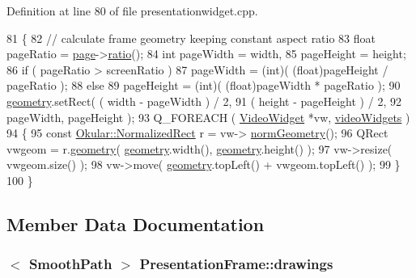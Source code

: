 Definition at line 80 of file presentationwidget.\+cpp.


\begin{DoxyCode}
81     \{
82         \textcolor{comment}{// calculate frame geometry keeping constant aspect ratio}
83         \textcolor{keywordtype}{float} pageRatio = \hyperlink{structPresentationFrame_ab40e6871a08519f4f2c97d3f1009f2a5}{page}->\hyperlink{classOkular_1_1Page_a2d7e8570510ab4cea44eed8a37caf671}{ratio}();
84         \textcolor{keywordtype}{int} pageWidth = width,
85             pageHeight = height;
86         \textcolor{keywordflow}{if} ( pageRatio > screenRatio )
87             pageWidth = (int)( (\textcolor{keywordtype}{float})pageHeight / pageRatio );
88         \textcolor{keywordflow}{else}
89             pageHeight = (int)( (\textcolor{keywordtype}{float})pageWidth * pageRatio );
90         \hyperlink{structPresentationFrame_af80fd4c4305934bb3723aec0b7f72bcf}{geometry}.setRect( ( width - pageWidth ) / 2,
91                           ( height - pageHeight ) / 2,
92                           pageWidth, pageHeight );
93         Q\_FOREACH ( \hyperlink{classVideoWidget}{VideoWidget} *vw, \hyperlink{structPresentationFrame_ace9a73ff662d4d93b3f9d7d22f6630cd}{videoWidgets} )
94         \{
95             \textcolor{keyword}{const} \hyperlink{classOkular_1_1NormalizedRect}{Okular::NormalizedRect} r = vw->
      \hyperlink{classVideoWidget_a44ccb0d6b334ca89f1edfa713137128f}{normGeometry}();
96             QRect vwgeom = r.\hyperlink{classOkular_1_1NormalizedRect_a006897c5fcff2c3a97b4141f1a967513}{geometry}( \hyperlink{structPresentationFrame_af80fd4c4305934bb3723aec0b7f72bcf}{geometry}.width(), 
      \hyperlink{structPresentationFrame_af80fd4c4305934bb3723aec0b7f72bcf}{geometry}.height() );
97             vw->resize( vwgeom.size() );
98             vw->move( \hyperlink{structPresentationFrame_af80fd4c4305934bb3723aec0b7f72bcf}{geometry}.topLeft() + vwgeom.topLeft() );
99         \}
100     \}
\end{DoxyCode}


\subsection{Member Data Documentation}
\hypertarget{structPresentationFrame_ac7a2505dbc93ec1dde1851cbfcdc11a8}{
\subsubsection[{drawings}]{$<$ {\bf Smooth\+Path} $>$ Presentation\+Frame\+::drawings}}\label{structPresentationFrame_ac7a2505dbc93ec1dde1851cbfcdc11a8}



